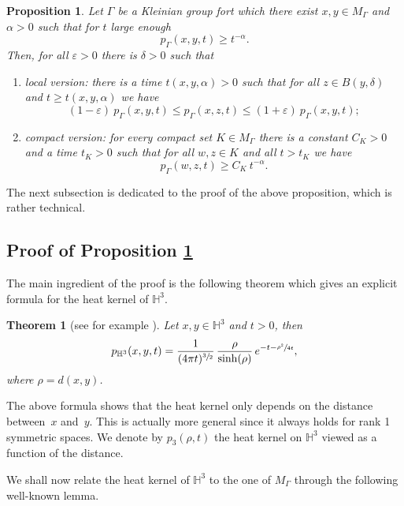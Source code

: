 \documentclass[JEP,XML,SOM,Unicode,NoFloatCountersInSection,published]{cedram}
\let\epsilon\varepsilon
\theoremstyle{plain}
\newtheorem{theoreme}[equation]{Theorem}
\newtheorem{proposition}[equation]{Proposition}
\theoremstyle{definition}
\newcommand{\HH}{\mathbb{H}}
\begin{document}
\begin{proposition}
\label{propheatkernellip}
Let $\Gamma$ be a Kleinian group fort which there exist $x,y \in M_{\Gamma}$ and $\alpha > 0$ such that for $t$ large enough
\[
p_{\Gamma}(x,y,t) \ge t^{-\alpha}.
\]
Then, for all $\epsilon > 0$ there is $\delta > 0$ such that
\begin{enumerate}
\item \emph{local version:} there is a time $t(x,y, \alpha) > 0$ such that for all $z \in B(y,\delta)$ and $t \ge t(x,y, \alpha)$ we have
\[
(1 - \epsilon) \ p_{\Gamma}(x,y,t) \le p_{\Gamma}(x,z,t) \le (1 + \epsilon) \ p_{\Gamma}(x,y,t) ;
\]
\item \emph{compact version:} for every compact set $K \in M_{\Gamma}$ there is a constant $C_K > 0$ and a time $t_K > 0$ such that for all $w,z \in K$ and all $t > t_K$ we have
\[
p_{\Gamma}(w,z,t) \ge C_K \ t^{-\alpha}.
\]
\end{enumerate}
\end{proposition}

The next subsection is dedicated to the proof of the above proposition, which is rather technical.

\subsection{Proof of Proposition \ref{propheatkernellip} } The main ingredient of the proof is the following theorem which gives an explicit formula for the heat kernel of $\HH^3$.

\begin{theoreme}[see for example \cite{artgrigoheatkernelhyper}]
\label{theogrigoformuleheatkernelhyp}
Let $x, y \in \HH^3$ and $t > 0$, then
\begin{equation}
\label{formuleniyauchaleur}
p_{\HH^3}(x,y,t) = \frac{1}{(4\pi t)^{\sfrac{3}{2}}}\, \frac{\rho}{\sinh(\rho)}\, e^{- t - \sfrac{\rho^2}{4t}},
\end{equation}
where $\rho = d(x,y)$.
\end{theoreme}

The above formula shows that the heat kernel only depends on the distance between~$x$ and~$y$. This is actually more general since it always holds for rank 1 symmetric spaces. We denote by $p_{3}(\rho,t)$ the heat kernel on $\HH^3$ viewed as a function of the distance.

We shall now relate the heat kernel of $\HH^3$ to the one of $M_{\Gamma}$ through the following well-known lemma.
\end{document}
